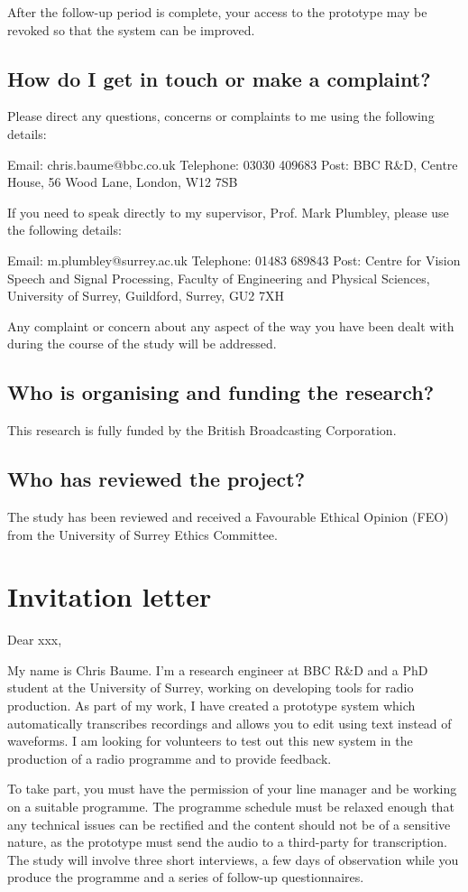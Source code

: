 After the follow-up period is complete, your access to the prototype may be
revoked so that the system can be improved.
 
\subsection{How do I get in touch or make a complaint?}
Please direct any questions, concerns or complaints to me using the following
details:

Email: chris.baume@bbc.co.uk
Telephone: 03030 409683
Post: BBC R\&D, Centre House, 56 Wood Lane, London, W12 7SB

If you need to speak directly to my supervisor, Prof. Mark Plumbley, please use
the following details:

Email: m.plumbley@surrey.ac.uk
Telephone: 01483 689843
Post: Centre for Vision Speech and Signal Processing, Faculty of Engineering and Physical Sciences, University of Surrey, Guildford, Surrey, GU2 7XH

Any complaint or concern about any aspect of the way you have been dealt with
during the course of the study will be addressed.

\subsection{Who is organising and funding the research?}
This research is fully funded by the British Broadcasting Corporation.

\subsection{Who has reviewed the project?}
The study has been reviewed and received a Favourable Ethical Opinion (FEO)
from the University of Surrey Ethics Committee.

\section{Invitation letter}
Dear xxx,

My name is Chris Baume. I’m a research engineer at BBC R\&D and a PhD student at
the University of Surrey, working on developing tools for radio production. As
part of my work, I have created a prototype system which automatically
transcribes recordings and allows you to edit using text instead of waveforms.
I am looking for volunteers to test out this new system in the production of a
radio programme and to provide feedback.

To take part, you must have the permission of your line manager and be working
on a suitable programme. The programme schedule must be relaxed enough that any
technical issues can be rectified and the content should not be of a sensitive
nature, as the prototype must send the audio to a third-party for
transcription. The study will involve three short interviews, a few days of
observation while you produce the programme and a series of follow-up
questionnaires. 

